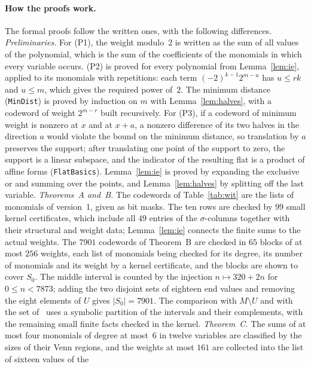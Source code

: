 \documentclass[11pt]{article}
\theoremstyle{remark}
\begin{document}
\paragraph{How the proofs work.}
The formal proofs follow the written ones, with the following differences.
\emph{Preliminaries.} For (P1), the weight modulo~$2$ is written as the sum of
all values of the polynomial, which is the sum of the coefficients of the
monomials in which every variable occurs. (P2) is proved for every polynomial
from Lemma~\ref{lem:ie}, applied to its monomials with repetitions: each term
$(-2)^{k-1}2^{m-u}$ has $u\le rk$ and $u\le m$, which gives the required
power of~$2$. The minimum distance (\texttt{MinDist}) is proved by induction on
$m$ with Lemma~\ref{lem:halves}, with a codeword of weight $2^{m-r}$ built
recursively. For (P3), if a codeword of minimum weight is nonzero at $x$ and
at $x+a$, a nonzero difference of its two halves in the direction $a$ would
violate the bound on the minimum distance, so translation by $a$ preserves
the support; after translating one point of the support to zero, the
support is a linear subspace, and the indicator of the resulting flat is a
product of affine forms (\texttt{FlatBasics}). Lemma~\ref{lem:ie} is proved by expanding the
exclusive or and summing over the points, and Lemma~\ref{lem:halves} by
splitting off the last variable.
\emph{Theorems~A and~B.} The codewords of Table~\ref{tab:wit} are the lists of
monomials of version~1, given as bit masks. The ten rows are checked by $99$
small kernel certificates, which include all $49$ entries of the
$\sigma$-columns together with their structural and weight data;
Lemma~\ref{lem:ie} connects the finite sums to the actual weights. The
$7901$ codewords of Theorem~B are checked in $65$ blocks of at most $256$
weights, each list of monomials being checked for its degree, its number of
monomials and its weight by a kernel certificate, and the blocks are shown to
cover $S_0$. The middle interval is counted by the injection $n\mapsto320+2n$
for $0\le n<7873$; adding the two disjoint sets of eighteen end values and
removing the eight elements of $U$ gives $|S_0|=7901$. The comparison with
$M\setminus U$ and with the set of~\cite[Proposition~4]{la} uses a symbolic
partition of the intervals and their complements, with the remaining small
finite facts checked in the kernel.
\emph{Theorem~C.} The sums of at most four monomials of degree at most~$6$ in
twelve variables are classified by the sizes of their Venn regions, and the
weights at most $161$ are collected into the list of sixteen values of the
\end{document}
